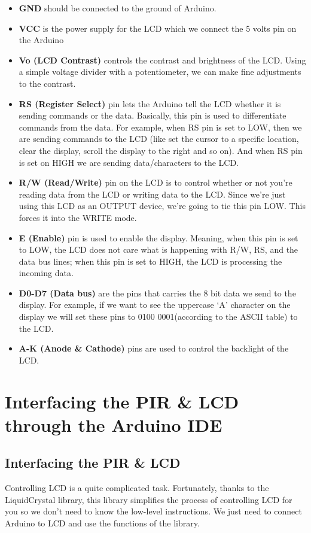 \begin{itemize}
  \item \textbf{GND} should be connected to the ground of Arduino.
  \item \textbf{VCC} is the power supply for the LCD which we connect the 5 volts pin on the Arduino
  \item \textbf{Vo (LCD Contrast) } controls the contrast and brightness of the LCD. Using a simple voltage divider with a potentiometer, we can make fine adjustments to the contrast.
  \item \textbf{RS (Register Select) }  pin lets the Arduino tell the LCD whether it is sending commands or the data. Basically, this pin is used to differentiate commands from the data.
For example, when RS pin is set to LOW, then we are sending commands to the LCD (like set the cursor to a specific location, clear the display, scroll the display to the right and so on). And when RS pin is set on HIGH we are sending data/characters to the LCD.
  \item \textbf{R/W (Read/Write) } pin on the LCD is to control whether or not you’re reading data from the LCD or writing data to the LCD. Since we’re just using this LCD as an OUTPUT device, we’re going to tie this pin LOW. This forces it into the WRITE mode.
  \item \textbf{E (Enable) } pin is used to enable the display. Meaning, when this pin is set to LOW, the LCD does not care what is happening with R/W, RS, and the data bus lines; when this pin is set to HIGH, the LCD is processing the incoming data.
  \item \textbf{D0-D7 (Data bus) } are the pins that carries the 8 bit data we send to the display. For example, if we want to see the uppercase ‘A’ character on the display we will set these pins to 0100 0001(according to the ASCII table) to the LCD.
  \item \textbf{A-K (Anode \& Cathode) } pins are used to control the backlight of the LCD.
\end{itemize}


\section{Interfacing the PIR \& LCD through the Arduino IDE}
\label{sec:pir-lcd-arduino-code}
\subsection{Interfacing the PIR \& LCD}
Controlling LCD is a quite complicated task. Fortunately, thanks to the LiquidCrystal library, this library simplifies the process of controlling LCD for you so we don't need to know the low-level instructions. We just need to connect Arduino to LCD and use the functions of the library.

